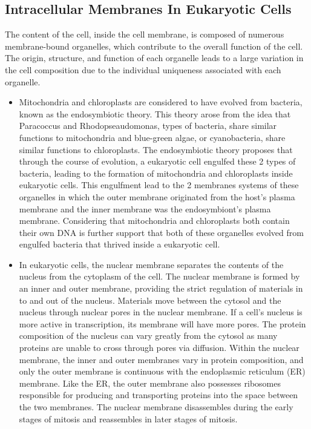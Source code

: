 \documentclass[
]{book}
\providecommand{\tightlist}{%
  \setlength{\itemsep}{0pt}\setlength{\parskip}{0pt}}
\begin{document}
\hypertarget{intracellular-membranes-in-eukaryotic-cells}{%
\subsection{Intracellular Membranes In Eukaryotic Cells}\label{intracellular-membranes-in-eukaryotic-cells}}

The content of the cell, inside the cell membrane, is composed of numerous membrane-bound organelles, which contribute to the overall function of the cell. The origin, structure, and function of each organelle leads to a large variation in the cell composition due to the individual uniqueness associated with each organelle.

\begin{itemize}
\tightlist
\item
  Mitochondria and chloroplasts are considered to have evolved from bacteria, known as the endosymbiotic theory. This theory arose from the idea that Paracoccus and Rhodopseaudomonas, types of bacteria, share similar functions to mitochondria and blue-green algae, or cyanobacteria, share similar functions to chloroplasts. The endosymbiotic theory proposes that through the course of evolution, a eukaryotic cell engulfed these 2 types of bacteria, leading to the formation of mitochondria and chloroplasts inside eukaryotic cells. This engulfment lead to the 2 membranes systems of these organelles in which the outer membrane originated from the host's plasma membrane and the inner membrane was the endosymbiont's plasma membrane. Considering that mitochondria and chloroplasts both contain their own DNA is further support that both of these organelles evolved from engulfed bacteria that thrived inside a eukaryotic cell.
\item
  In eukaryotic cells, the nuclear membrane separates the contents of the nucleus from the cytoplasm of the cell. The nuclear membrane is formed by an inner and outer membrane, providing the strict regulation of materials in to and out of the nucleus. Materials move between the cytosol and the nucleus through nuclear pores in the nuclear membrane. If a cell's nucleus is more active in transcription, its membrane will have more pores. The protein composition of the nucleus can vary greatly from the cytosol as many proteins are unable to cross through pores via diffusion. Within the nuclear membrane, the inner and outer membranes vary in protein composition, and only the outer membrane is continuous with the endoplasmic reticulum (ER) membrane. Like the ER, the outer membrane also possesses ribosomes responsible for producing and transporting proteins into the space between the two membranes. The nuclear membrane disassembles during the early stages of mitosis and reassembles in later stages of mitosis.

\end{itemize}
\end{document}
